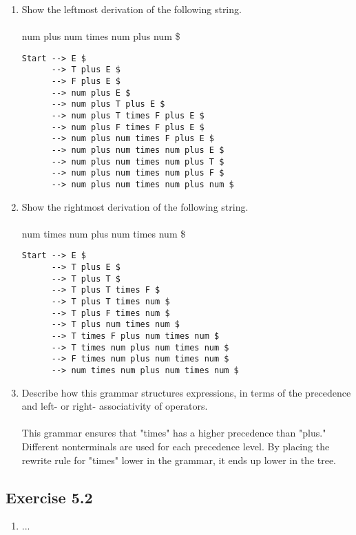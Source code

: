 \documentclass[letterpaper, 10pt,DIV=13]{scrartcl}
\numberwithin{equation}{section} %
\numberwithin{figure}{section} %
\numberwithin{table}{section} %
\begin{document}
\begin{enumerate}[label=\textbf{\Alph*}]
\item Show the leftmost derivation of the following string.\\ \\
num plus num times num plus num \$ \\
\begin{lstlisting}
Start --> E $
      --> T plus E $
      --> F plus E $
      --> num plus E $
      --> num plus T plus E $
      --> num plus T times F plus E $
      --> num plus F times F plus E $
      --> num plus num times F plus E $
      --> num plus num times num plus E $
      --> num plus num times num plus T $
      --> num plus num times num plus F $
      --> num plus num times num plus num $
\end{lstlisting}

\pagebreak

\item Show the rightmost derivation of the following string.\\ \\
num times num plus num times num \$ \\
\begin{lstlisting}
Start --> E $
      --> T plus E $
      --> T plus T $
      --> T plus T times F $
      --> T plus T times num $
      --> T plus F times num $
      --> T plus num times num $
      --> T times F plus num times num $
      --> T times num plus num times num $
      --> F times num plus num times num $
      --> num times num plus num times num $
\end{lstlisting}

\item Describe how this grammar structures expressions, in terms of the precedence and left- or right- associativity of operators.\\ \\
This grammar ensures that "times" has a higher precedence than "plus." Different nonterminals are used for each precedence level. By placing the rewrite rule for "times" lower in the grammar, it ends up lower in the tree.
\end{enumerate}

\subsection*{Exercise 5.2}
\begin{enumerate}[label=\Alph*]
\item ... \\
\end{enumerate}
\end{document}
